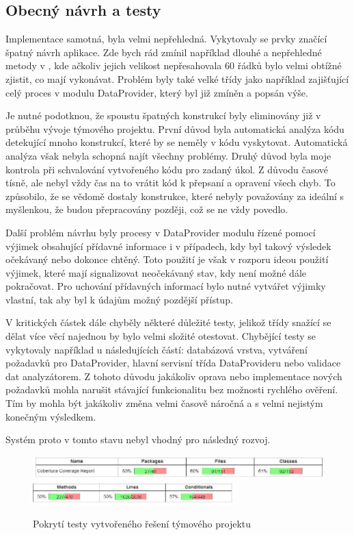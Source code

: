 \documentclass[thesis=B,czech]{FITthesis}[2012/06/26]
\begin{document}
\subsection{Obecný návrh a testy}
Implementace samotná, byla velmi nepřehledná. Vykytovaly se prvky značící špatný návrh aplikace.
Zde bych rád zmínil například dlouhé a nepřehledné metody v
, kde ačkoliv jejich velikost 
nepřesahovala 60 řádků bylo velmi obtížné zjistit, co mají vykonávat. Problém byly také velké třídy
jako například  zajišťující celý proces v modulu DataProvider, který byl již zmíněn a popsán výše.
\par
Je nutné podotknou, že spoustu špatných konstrukcí byly eliminovány již v průběhu vývoje týmového projektu.
První důvod byla automatická analýza kódu detekující mnoho konstrukcí, které by se neměly v kódu vyskytovat. Automatická analýza
však nebyla schopná najít všechny problémy. Druhý důvod byla moje kontrola při schvalování vytvořeného kódu pro 
zadaný úkol. Z důvodu časové tísně, ale nebyl vždy čas na to vrátit kód k přepsaní a opravení všech chyb. To způsobilo, že
se vědomě dostaly konstrukce, které nebyly považovány za ideální s myšlenkou, že budou přepracovány později, což se ne vždy povedlo.
\par
Další problém návrhu byly procesy v DataProvider modulu řízené pomocí výjimek obsahující 
přídavné informace i v případech, kdy byl takový výsledek očekávaný nebo dokonce chtěný. 
Toto použití je však v rozporu ideou použití výjimek, které mají signalizovat neočekávaný stav, kdy není možné dále pokračovat.\cite{exception}
Pro uchování přídavných informací bylo nutné vytvářet výjimky vlastní, tak aby byl k údajům možný pozdější přístup.
\par
V kritických částek dále chyběly některé důležité testy, jelikož třídy snažící se dělat více věcí najednou by bylo velmi
složité otestovat. Chybějící testy se vykytovaly například u následujících částí: databázová vrstva, vytváření požadavků pro DataProvider,
hlavní servisní třída DataProvideru nebo validace dat analyzátorem. Z tohoto důvodu jakákoliv oprava nebo implementace nových požadavků 
mohla narušit stávající funkcionalitu bez možnosti rychlého ověření. Tím by mohla být jakákoliv změna velmi časově náročná a s velmi nejistým konečným výsledkem.

Systém proto v tomto stavu nebyl vhodný pro následný rozvoj.

\begin{figure}[h]\centering
 	\includegraphics[width=1.0\textwidth]{resources/cobertura-report-old-1}
 	\includegraphics[width=0.7\textwidth]{resources/cobertura-report-old-2}
	\caption[Pokrytí testy vytvořeného řešení]{Pokrytí testy vytvořeného řešení týmového projektu}\label{fig:dp-dia}
\end{figure}
\end{document}
